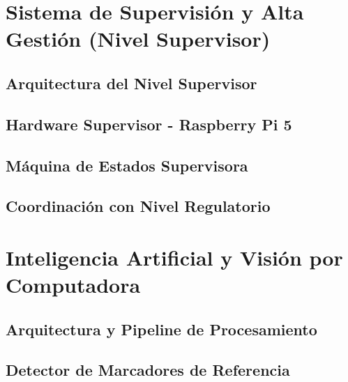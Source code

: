 \documentclass[a4paper,12pt]{report}
\begin{document}
\section{Sistema de Supervisión y Alta Gestión (Nivel Supervisor)}

\subsection{Arquitectura del Nivel Supervisor}


\subsection{Hardware Supervisor - Raspberry Pi 5}


\subsection{Máquina de Estados Supervisora}




\subsection{Coordinación con Nivel Regulatorio}




\section{Inteligencia Artificial y Visión por Computadora}

\subsection{Arquitectura y Pipeline de Procesamiento}



\subsection{Detector de Marcadores de Referencia}




\end{document}

